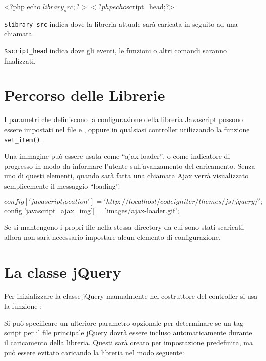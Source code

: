 \begin{code}
<?php echo $library_src;?>
<?php echo $script_head;?>
\end{code}

\verb|$library_src| indica dove la libreria attuale sarà caricata in seguito ad una chiamata.

\verb|$script_head| indica dove gli eventi, le funzioni o altri comandi saranno finalizzati.

\section*{Percorso delle Librerie}
I parametri che definiscono la configurazione della libreria Javascript possono essere impostati nel file  e , oppure in qualsiasi controller utilizzando la funzione \verb|set_item()|.

Una immagine può essere usata come ``ajax loader'', o come indicatore di progresso in modo da informare l'utente sull'avanzamento del caricamento. Senza uno di questi elementi, quando sarà fatta una chiamata Ajax verrà visualizzato semplicemente il messaggio ``loading''.

\begin{code}
$config['javascript_location'] = 'http://localhost/codeigniter/themes/js/jquery/';
$config['javascript_ajax_img'] = 'images/ajax-loader.gif';
\end{code}

Se si mantengono i propri file nella stessa directory da cui sono stati scaricati, allora non sarà necessario impostare alcun elemento di configurazione.

\section*{La classe jQuery}
Per inizializzare la classe jQuery manualmente nel costruttore del controller si usa la funzione :


Si può specificare un ulteriore parametro opzionale per determinare se un tag script per il file principale jQuery dovrà essere incluso automaticamente durante il caricamento della libreria. Questi sarà creato per impostazione predefinita, ma può essere evitato caricando la libreria nel modo seguente:

